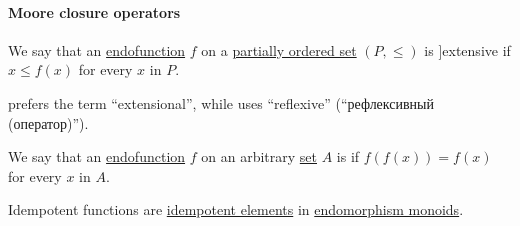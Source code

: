 \paragraph{Moore closure operators}

\begin{definition}\label{def:extensive_function}
  We say that an \hyperref[def:function/endofunction]{endofunction} \( f \) on a \hyperref[def:partially_ordered_set]{partially ordered set} \( (P, \leq) \) is \term[en=extensive \cite[111]{Birkhoff1967Lattices}]{extensive} if \( x \leq f(x) \) for every \( x \) in \( P \).
\end{definition}
\begin{comments}
  \item {} prefers the term \enquote{extensional}, while  uses \enquote{reflexive} (\enquote{рефлексивный (оператор)}).
\end{comments}

\begin{definition}\label{def:idempotent_function}
  We say that an \hyperref[def:function/endofunction]{endofunction} \( f \) on an arbitrary \hyperref[def:set]{set} \( A \) is  if \( f(f(x)) = f(x) \) for every \( x \) in \( A \).
\end{definition}
\begin{comments}
  \item Idempotent functions are \hyperref[def:monoid_idempotent]{idempotent elements} in \hyperref[def:endomorphism_monoid]{endomorphism monoids}.
\end{comments}

